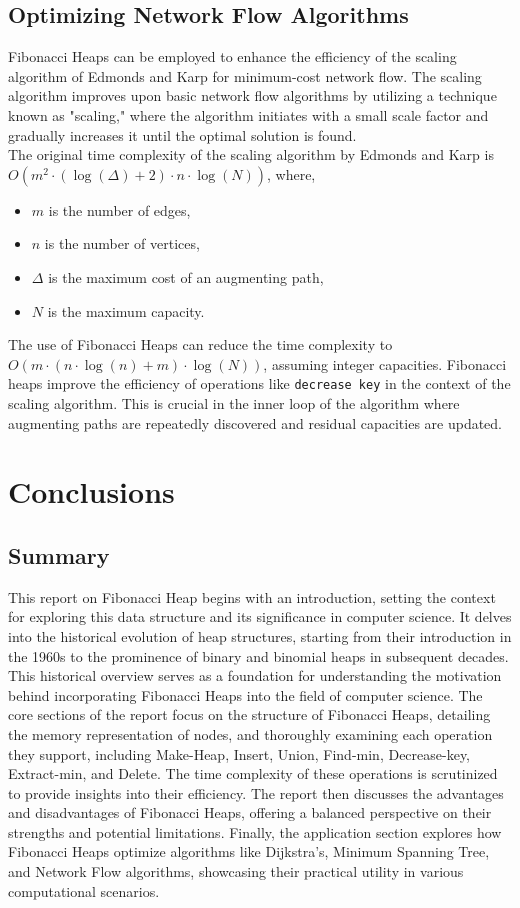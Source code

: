 \documentclass[12pt, a4paper]{article}
\begin{document}
\subsection{Optimizing Network Flow Algorithms}
Fibonacci Heaps can be employed to enhance the efficiency of the scaling algorithm of Edmonds and Karp for minimum-cost network flow. The scaling algorithm improves upon basic network flow algorithms by utilizing a technique known as "scaling," where the algorithm initiates with a small scale factor and gradually increases it until the optimal solution is found.\\
The original time complexity of the scaling algorithm by Edmonds and Karp is \(O(m^2 \cdot (\log(\Delta) + 2) \cdot n \cdot \log(N))\), where,
\begin{itemize}
	\item \(m\) is the number of edges,
	\item \(n\) is the number of vertices,
	\item \(\Delta\) is the maximum cost of an augmenting path,
	\item \(N\) is the maximum capacity.
\end{itemize}
The use of Fibonacci Heaps can reduce the time complexity to \(O(m \cdot (n \cdot \log(n) + m) \cdot \log(N))\), assuming integer capacities.\cite{NetworkFlow}
Fibonacci heaps improve the efficiency of operations like \texttt{decrease key} in the context of the scaling algorithm. This is crucial in the inner loop of the algorithm where augmenting paths are repeatedly discovered and residual capacities are updated.
\pagebreak
	
	
	\section{Conclusions}
	\subsection*{Summary}
	This report on Fibonacci Heap begins with an introduction, setting the context for exploring this data structure and its significance in computer science. It delves into the historical evolution of heap structures, starting from their introduction in the 1960s to the prominence of binary and binomial heaps in subsequent decades. This historical overview serves as a foundation for understanding the motivation behind incorporating Fibonacci Heaps into the field of computer science.
	The core sections of the report focus on the structure of Fibonacci Heaps, detailing the memory representation of nodes, and thoroughly examining each operation they support, including Make-Heap, Insert, Union, Find-min, Decrease-key, Extract-min, and Delete. The time complexity of these operations is scrutinized to provide insights into their efficiency. The report then discusses the advantages and disadvantages of Fibonacci Heaps, offering a balanced perspective on their strengths and potential limitations. Finally, the application section explores how Fibonacci Heaps optimize algorithms like Dijkstra's, Minimum Spanning Tree, and Network Flow algorithms, showcasing their practical utility in various computational scenarios.

	
	\pagebreak
	
	
	
	
\end{document}
